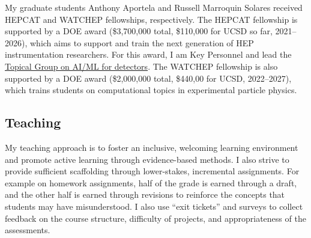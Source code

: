 \documentclass[11pt,letterpaper,notitlepage]{article}
\begin{document}
My graduate students Anthony Aportela and Russell Marroquin Solares received HEPCAT and WATCHEP fellowships, respectively.
The HEPCAT fellowship is supported by a DOE award (\$3,700,000 total, \$110,000 for UCSD so far, 2021--2026), which aims to support and train the next generation of HEP instrumentation researchers.
For this award, I am Key Personnel and lead the \href{https://hepcat.ucsd.edu/topical-groups/tg7-ai-ml-for-detectors-2/}{Topical Group on AI/ML for detectors}.
The WATCHEP fellowship is also supported by a DOE award (\$2,000,000 total, \$440,00 for UCSD, 2022--2027), which trains students on computational topics in experimental particle physics.

\vspace{-1ex}
\subsection*{Teaching}

My teaching approach is to foster an inclusive, welcoming learning environment and promote active learning through evidence-based methods.
I also strive to provide sufficient scaffolding through lower-stakes, incremental assignments.
For example on homework assignments, half of the grade is earned through a draft, and the other half is earned through revisions to reinforce the concepts that students may have misunderstood.
I also use ``exit tickets'' and surveys to collect feedback on the course structure, difficulty of projects, and appropriateness of the assessments.
\end{document}
